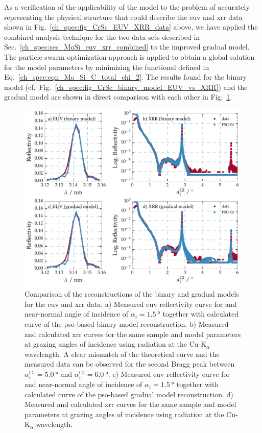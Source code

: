 As a verification of the applicability of the model to the problem of accurately representing the physical structure that could describe the \gls{euv} and \gls{xrr} data shown in Fig.~\ref{ch_spec:fig_CrSc_EUV_XRR_data} above, we have applied the combined analysis technique for the two data sets described in Sec.~\ref{ch_spec:sec_MoSi_euv_xrr_combined} to the improved gradual model. The particle swarm optimization approach is applied to obtain a global solution for the model parameters by minimizing the functional defined in Eq.~\eqref{ch_spec:eqn_Mo_Si_C_total_chi_2}. The results found for the binary model (cf.~Fig.~\ref{ch_spec:fig_CrSc_binary_model_EUV_vs_XRR}) and the gradual model are shown in direct comparison with each other in Fig.~\ref{ch_spec:fig_CrSc_bianry_vs_gradual_model_fits}.
\begin{figure}[htbp]
  \centering
  \includegraphics[width=\textwidth]{img/CrSc_bianry_vs_gradual_model_fits}
  \caption{Comparison of the reconstructions of the binary and gradual models for the \gls{euv} and \gls{xrr} data. a) Measured \gls{euv} reflectivity curve for and near-normal angle of incidence of $\alpha_i=\SI{1.5}{\degree}$ together with calculated curve of the \gls{pso}-based binary model reconstruction. b) Measured and calculated \gls{xrr} curves for the same sample and model parameters at grazing angles of incidence using radiation at the Cu-K$_\alpha$ wavelength. A clear mismatch of the theoretical curve and the measured data can be observed for the second Bragg peak between $\alpha_i^\text{GI} = \SI{5.0}{\degree}$ and $\alpha_i^\text{GI} = \SI{6.0}{\degree}$.
  c) Measured \gls{euv} reflectivity curve for and near-normal angle of incidence of $\alpha_i=\SI{1.5}{\degree}$ together with calculated curve of the \gls{pso}-based gradual model reconstruction. d) Measured and calculated \gls{xrr} curves for the same sample and model parameters at grazing angles of incidence using radiation at the Cu-K$_\alpha$ wavelength.}
  \label{ch_spec:fig_CrSc_bianry_vs_gradual_model_fits}
\end{figure}
